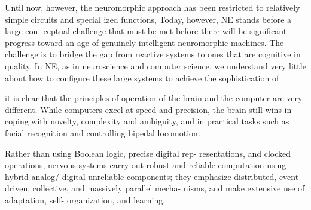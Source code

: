 Until now, however, the neuromorphic
approach has been restricted to relatively simple circuits and special
ized functions,
Today, however, NE stands before a large con-
ceptual challenge that must be met before there will be
significant progress toward an age of genuinely intelligent
neuromorphic machines. The challenge is to bridge the gap
from reactive systems to ones that are cognitive in quality.
In NE, as in neuroscience and computer science, we
understand very little about how to configure these large
systems to achieve the sophistication of





it is clear that the principles
of operation of the brain and the computer are very different.
While computers excel at speed and precision, the brain still
wins in coping with novelty, complexity and ambiguity, and
in practical tasks such as facial recognition and controlling
bipedal locomotion.

Rather than using Boolean logic, precise digital rep-
resentations, and clocked operations, nervous systems carry
out robust and reliable computation using hybrid analog/
digital unreliable components; they emphasize distributed,
event-driven, collective, and massively parallel mecha-
nisms, and make extensive use of adaptation, self-
organization, and learning.

